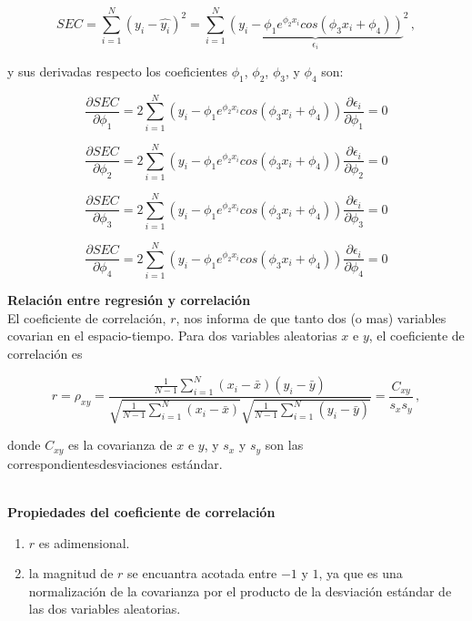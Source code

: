 \documentclass[
]{agujournal2019}
\providecommand{\tightlist}{%
  \setlength{\itemsep}{0pt}\setlength{\parskip}{0pt}}\usepackage{longtable,booktabs,array}
\begin{document}
\[SEC=\sum\limits^N_{i=1}(y_i-\hat{y_i})^2=\sum\limits^N_{i=1}
              {\underbrace{\left(y_i - \phi_1 e^{\phi_2 x_i} cos(\phi_3 x_i + \phi_4)\right)}_{\epsilon_i}}^2\,,\]

y sus derivadas respecto los coeficientes \(\phi_1\), \(\phi_2\),
\(\phi_3\), y \(\phi_4\) son:

\[\frac{\partial{SEC}}{\partial{\phi_1}}=
     2\sum\limits^N_{i=1}\left(y_i - \phi_1 e^{\phi_2 x_i} cos(\phi_3 x_i + \phi_4)\right)
     \frac{\partial{\epsilon_i}}{\partial{\phi_1}}=0\]

\[\frac{\partial{SEC}}{\partial{\phi_2}}=2\sum\limits^N_{i=1}\left(y_i - \phi_1 e^{\phi_2 x_i} cos(\phi_3 x_i + \phi_4)\right)
\frac{\partial{\epsilon_i}}{\partial{\phi_2}}=0\]

\[\frac{\partial{SEC}}{\partial{\phi_3}}=
    2\sum\limits^N_{i=1}\left(y_i - \phi_1 e^{\phi_2 x_i} cos(\phi_3 x_i + \phi_4)\right)
    \frac{\partial{\epsilon_i}}{\partial{\phi_3}}=0\]

\[\frac{\partial{SEC}}{\partial{\phi_4}}=
    2\sum\limits^N_{i=1}\left(y_i - \phi_1 e^{\phi_2 x_i} cos(\phi_3 x_i + \phi_4)\right)
    \frac{\partial{\epsilon_i}}{\partial{\phi_4}}=0\]

\vspace{0.5cm}

\textbf{Relación entre regresión y correlación}\\

El coeficiente de correlación, \(r\), nos informa de que tanto dos (o
mas) variables covarian en el espacio-tiempo. Para dos variables
aleatorias \(x\) e \(y\), el coeficiente de correlación es

\[r=\rho_{xy}=\frac{\frac{1}{N-1}\sum\limits^N_{i=1}(x_i-\bar{x})(y_i-\bar{y})}
     {\sqrt{\frac{1}{N-1}\sum\limits^N_{i=1}(x_i-\bar{x})}
     \sqrt{\frac{1}{N-1}\sum\limits^N_{i=1}(y_i-\bar{y})}}=\frac{C_{xy}}{s_x s_y}\,,\]

donde \(C_{xy}\) es la covarianza de \(x\) e \(y\), y \(s_x\) y \(s_y\)
son las correspondientesdesviaciones estándar.\\
\strut \\
\textbf{Propiedades del coeficiente de correlación}\\

\begin{enumerate}
\def\labelenumi{(\arabic{enumi})}
\tightlist
\item
  \(r\) es adimensional.\\
\item
  la magnitud de \(r\) se encuantra acotada entre \(-1\) y \(1\), ya que
  es una normalización de la covarianza por el producto de la desviación
  estándar de las dos variables aleatorias.\\
\end{enumerate}
\end{document}
